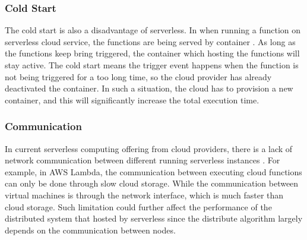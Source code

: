 \subsubsection{Cold Start}
The cold start is also a disadvantage of serverless. In when running a function on serverless cloud service, the functions are being served by container \cite{KeepingF68:online}. As long as the functions keep bring triggered, the container which hosting the functions will stay active. The cold start means the trigger event happens when the function is not being triggered for a too long time, so the cloud provider has already deactivated the container. In such a situation, the cloud has to provision a new container, and this will significantly increase the total execution time.
\subsubsection{Communication}
In current serverless computing offering from cloud providers, there is a lack of network communication between different running serverless instances \cite{hellerstein2018serverless}. For example, in AWS Lambda, the communication between executing cloud functions can only be done through slow cloud storage. While the communication between virtual machines is through the network interface, which is much faster than cloud storage. Such limitation could further affect the performance of the distributed system that hosted by serverless since the distribute algorithm largely depends on the communication between nodes.
